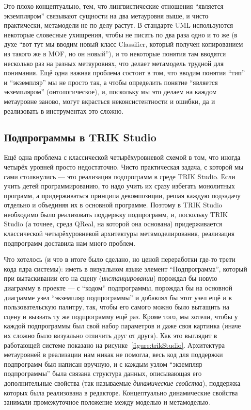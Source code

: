 \documentclass[a5paper]{article}
\begin{document}
Это плохо концептуально, тем, что лингвистические отношения ``является экземпляром'' связывают сущности на два метауровня выше, и чисто практически, метамодели не по делу растут. В стандарте UML используются некоторые словесные ухищрения, чтобы не писать по два раза одно и то же (в духе ``вот тут мы вводим новый класс Classifier, который получен копированием из такого же в MOF, но он новый''), и то некоторые понятия там вводятся несколько раз на разных метауровнях, что делает метамодель трудной для понимания. Ещё одна важная проблема состоит в том, что вводим понятия ``тип'' и ``экземпляр'' мы не просто так, а чтобы определить понятие ``является экземпляром'' (онтологическое), и, поскольку мы это делаем на каждом метауровне заново, могут вкрасться неконсистентности и ошибки, да и реализовать в инструментах это сложно.

\subsection{Подпрограммы в TRIK Studio}

Ещё одна проблема с классической четырёхуровневой схемой в том, что иногда четырёх уровней просто недостаточно. Чисто практическая задача, с которой мы сами столкнулись --- это реализация подпрограмм в среде TRIK Studio. Если учить детей программированию, то надо учить их сразу избегать монолитных программ, а придерживаться принципа декомпозиции, решая каждую подзадачу отдельно и объединяя их в основной программе. Поэтому в TRIK Studio необходимо было реализовать поддержку подпрограмм, и, поскольку TRIK Studio (а точнее, среда QReal, на которой она основана) придерживается классической четырёхуровневой архитектуры метамоделирования, реализация подпрограмм доставила нам много проблем. 

Что хотелось (и что в итоге было сделано, но ценой переработки где-то трети кода ядра системы): иметь в визуальном языке элемент ``Подпрограмма'', который при вытаскивании его на сцену (\textit{инстанцировании}) порождал бы новую диаграмму в проекте --- с ``кодом'' подпрограммы, порождал бы на основной диаграмме узел ``экземпляр подпрограммы'' и добавлял бы этот узел ещё и в пользовательскую палитру, так, чтобы его самого можно было вытащить на сцену и вызвать ту же подпрограмму ещё раз. Кроме того, мы хотели, чтобы у каждой подпрограммы был свой набор параметров и даже своя картинка (иначе их сложно было визуально отличить друг от друга). Как это выглядит в работающей системе показано на рисунке~\ref{figure:trikStudio}. Архитектура метауровней в реализации нам никак не помогла, весь код для поддержки подпрограмм был написан вручную, и с каждым узлом ``экземпляр подпрограммы'' была связана структура данных, описывающая его дополнительные свойства (так называемые \textit{динамические свойства}), поддержка которых была реализована в редакторе. Концептуально динамические свойства занимали промежуточное положение между моделью и метамоделью.
\end{document}
